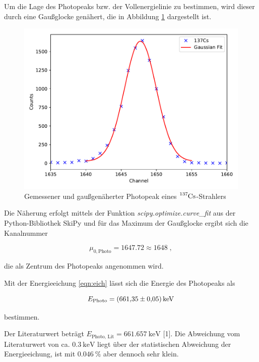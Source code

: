 Um die Lage des Photopeaks bzw. der Vollenergielinie zu bestimmen, wird dieser durch eine Gaußglocke genähert, die in Abbildung
\ref{fig:plot22} dargestellt ist.

\begin{figure}
  \centering
  \includegraphics{content/plot22.pdf}
  \caption{Gemessener und gaußgenäherter Photopeak eines $\ce{^{137}Cs}$-Strahlers}
  \label{fig:plot22}
\end{figure}

Die Näherung erfolgt mittels der Funktion \textit{scipy.optimize.curve\_fit} aus der Python-Bibliothek SkiPy und für
das Maximum der Gaußglocke ergibt sich die Kanalnummer

\begin{equation*}
  \mu_{0,\text{Photo}} = \num{1647.72} \approx \num{1648} \; ,
\end{equation*}

die als Zentrum des Photopeaks angenommen wird.

Mit der Energieeichung \eqref{eqn:eich} lässt sich die Energie des Photopeaks als

\begin{equation*}
  E_\text{Photo} = \SI{661.35 +- 0.05}{\kilo\eV}
\end{equation*}

bestimmen.

Der Literaturwert beträgt $E_\text{Photo, Lit} = \SI{661.657}{\kilo\eV}$ [1]. Die Abweichung vom Literaturwert 
von ca. $\SI{0.3}{\kilo\eV}$ liegt über der statistischen Abweichung der Energieeichung, 
ist mit $\SI{0.046}{\percent}$ aber dennoch sehr klein.

